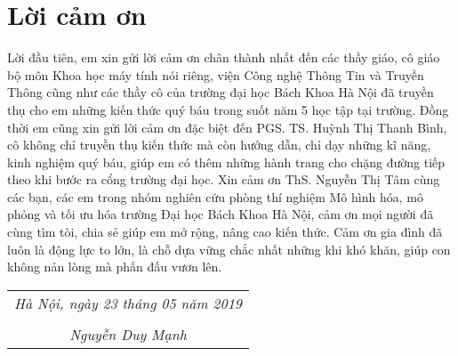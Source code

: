 \chapter*{Lời cảm ơn}
Lời đầu tiên, em xin gửi lời cảm ơn chân thành nhất đến các thầy giáo, cô giáo bộ môn Khoa học máy tính nói riêng, viện Công nghệ Thông Tin và Truyền Thông cũng như các thầy cô của trường đại học Bách Khoa Hà Nội đã truyền thụ cho em những kiến thức quý báu trong suốt năm 5 học tập tại trường. Đồng thời em cũng xin gửi lời cảm ơn đặc biệt đến PGS. TS. Huỳnh Thị Thanh Bình, cô không chỉ truyền thụ kiến thức mà còn hướng dẫn, chỉ dạy những kĩ năng, kinh nghiệm quý báu, giúp em có thêm những hành trang cho chặng đường tiếp theo khi bước ra cổng trường đại học.
\BlankLine
Xin cảm ơn ThS. Nguyễn Thị Tâm cùng các bạn, các em trong nhóm nghiên cứu phòng thí nghiệm Mô hình hóa, mô phỏng và tối ưu hóa trường Đại học Bách Khoa Hà Nội, cảm ơn mọi người đã cùng tìm tòi, chia sẻ giúp em mở rộng, nâng cao kiến thức.
\BlankLine
Cảm ơn gia đình đã luôn là động lực to lớn, là chỗ dựa vững chắc nhất những khi khó khăn, giúp con không nản lòng mà phấn đấu vươn lên.

\begin{table}[H]
    \raggedleft
    \begin{tabular}{c}
    \textit{Hà Nội, ngày  23  tháng   05   năm 2019} \\
                                                     \\
    \textit{Nguyễn Duy Mạnh}                        
    \end{tabular}
\end{table}